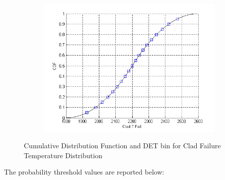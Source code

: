 \begin{figure}
        \centering %
        ~ %
        \begin{subfigure}[b]{0.48\textwidth}
                \centering
                \includegraphics[width=\textwidth]{figures/CladFailureDist.png}
                \caption{}
                \label{fig:CladFailure}
        \end{subfigure}
        \caption{Cumulative Distribution Function and DET bin for Clad Failure Temperature Distribution}\label{fig:CDFCladFailure}
\end{figure}
The probability threshold values are reported below:
\vspace{-5mm}
